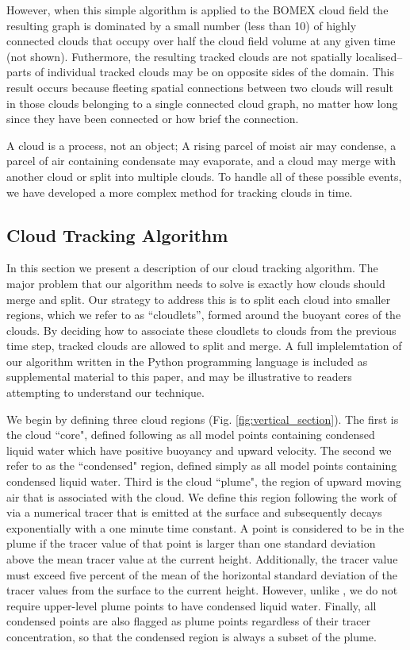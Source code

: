 \documentclass[acp]{copernicus}
\begin{document}
However, when this simple algorithm is applied to the BOMEX cloud field the 
resulting graph is dominated by a small number (less than 10) of highly 
connected clouds that occupy over half the cloud field volume at any given time 
(not shown).  Futhermore, the resulting tracked clouds are not spatially 
localised--parts of individual tracked clouds may be on opposite sides of the 
domain. This result occurs because fleeting spatial connections between two 
clouds will result in those clouds belonging to a single connected cloud graph, 
no matter how long since they have been connected or how brief the connection.  

A cloud is a process, not an object; A rising parcel of moist air may condense, 
a parcel of air containing condensate may evaporate, and a cloud may merge with another cloud or split into multiple clouds.  To handle all of these possible 
events, we have developed a more complex method for tracking clouds in time.

\subsection{Cloud Tracking Algorithm}

In this section we present a description of our cloud tracking algorithm.  The 
major problem that our algorithm needs to solve is exactly how clouds should 
merge and split.  Our strategy to address this is to split each cloud into 
smaller regions, which we refer to as ``cloudlets'', formed around the buoyant 
cores of the clouds.  By deciding how to associate these cloudlets to clouds 
from the previous time step, tracked clouds are allowed to split and merge. A 
full implelemtation of our algorithm written in the Python programming language 
is included as supplemental material to this paper, and may be illustrative to
readers attempting to understand our technique.

We begin by defining three cloud regions (Fig. \ref{fig:vertical_section}).  
The first is the cloud ``core", defined following \cite{Siebesma1995} as all 
model points containing condensed liquid water which have positive buoyancy and 
upward velocity.  The second we refer to as the ``condensed" region, defined 
simply as all model points containing condensed liquid water.  Third is the 
cloud ``plume", the region of upward moving air that is associated with the 
cloud.  We define this region following the work of \cite{Couvreux2010} via a 
numerical tracer that is emitted at the surface and subsequently decays 
exponentially with a one minute time constant.  A point is considered to be in 
the plume if the tracer value of that point is larger than one standard 
deviation above the mean tracer value at the current height.  Additionally, 
the tracer value must exceed five percent of the mean of the horizontal 
standard deviation of the tracer values from the surface to the current height.  
However, unlike \citeauthor{Couvreux2010}, we do not require upper-level 
plume points to have condensed liquid water.  Finally, all condensed points are 
also flagged as plume points regardless of their tracer concentration, so that 
the condensed region is always a subset of the plume.
\end{document}
